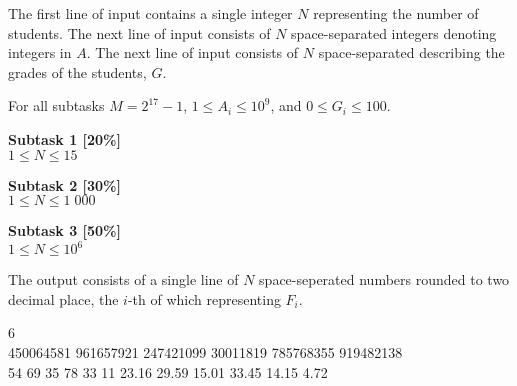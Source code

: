 The first line of input contains a single integer $N$ representing the number of students. The next line of input consists of $N$ space-separated integers denoting integers in $A$. The next line of input consists of $N$ space-separated describing the grades of the students, $G$.

\constraints
For all subtasks $M = 2^{17} - 1$, $1 \leq A_i \leq 10^9$, and $0 \leq G_i \leq 100$.

\textbf{Subtask 1 [20\%]} \\
$1 \leq N \leq 15$

\textbf{Subtask 2 [30\%]} \\
$1 \leq N \leq 1\;000$

\textbf{Subtask 3 [50\%]} \\
$1 \leq N \leq 10^6$

\outputformat
The output consists of a single line of $N$ space-seperated numbers rounded to two decimal place, the $i$-th of which representing $F_i$.

\addsample
{
    6 \\
    450064581 961657921 247421099 30011819 785768355 919482138 \\
    54 69 35 78 33 11
}
{
    23.16 29.59 15.01 33.45 14.15 4.72
}